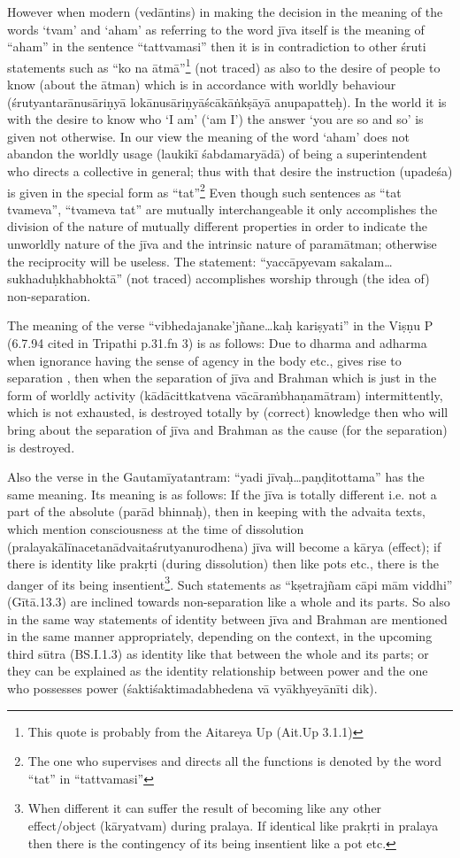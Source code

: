 However when modern (vedāntins) in making the decision in the meaning of the words ‘tvam’ and ‘aham’ as referring to    the word jīva itself is the meaning of “aham” in the sentence “tattvamasi” then it is in contradiction to other śruti statements such as “ko na ātmā”\footnote{This quote is probably from the Aitareya Up (Ait.Up 3.1.1)} (not traced) as also to the desire of people to know (about the ātman)  which is in accordance with worldly behaviour (śrutyantarānusāriṇyā lokānusāriṇyāścākāṅkṣāyā anupapatteḥ). In the world it is with the desire to know who ‘I am’ (`am I') the answer ‘you are so and so’ is given not otherwise. In our view the meaning of the word ‘aham’ does not abandon the worldly usage (laukikī śabdamaryādā) of being a superintendent who directs a collective in general; thus with that desire the instruction (upadeśa) is given in the special form as “tat”\footnote{The one who supervises and directs all the functions is denoted by the word “tat” in “tattvamasi”} Even though such sentences as “tat tvameva”, “tvameva tat” are mutually interchangeable it only accomplishes the division of the nature of mutually different properties in order to indicate the unworldly nature of the jīva and the intrinsic nature of paramātman; otherwise the reciprocity will be useless. The statement: “yaccāpyevam sakalam…sukhaduḥkhabhoktā” (not traced) accomplishes worship through (the idea of) non-separation.

The meaning of the verse “vibhedajanake’jñane…kaḥ kariṣyati” in the Viṣṇu P  (6.7.94 cited in Tripathi p.31.fn 3) is as follows: Due to dharma and adharma when ignorance having the sense of agency in the body etc., gives rise to separation , then when the separation of jīva and Brahman which is just in the form of worldly activity (kādācittkatvena vācāraṁbhaṇamātram) intermittently, which is not exhausted, is destroyed totally by (correct) knowledge then who will bring about the separation of jīva and Brahman as the cause (for the separation) is destroyed.

Also the verse in the Gautamīyatantram: “yadi jīvaḥ…paṇḍitottama” has the same meaning. Its meaning is as follows: If the jīva is totally different i.e. not a part of the absolute (parād bhinnaḥ), then in keeping with the advaita texts, which mention consciousness at the time of dissolution (pralayakālīnacetanādvaitaśrutyanurodhena) jīva will become a kārya (effect); if there is identity like prakṛti (during dissolution) then like pots etc., there is the danger of its being insentient\footnote{When different it can suffer the result of becoming like any other effect/object (kāryatvam) during pralaya. If identical like prakṛti in pralaya then there is the contingency of its being insentient like a pot etc.}. Such statements as “kṣetrajñam cāpi mām viddhi” (Gītā.13.3) are inclined towards non-separation like a whole and its parts. So also in the same way statements of identity between jīva and Brahman are mentioned in the same manner appropriately, depending on the context, in the upcoming third sūtra (BS.I.1.3) as identity like that between the whole and its parts; or they can be explained as the identity relationship between power and the one who possesses power (śaktiśaktimadabhedena vā vyākhyeyānīti dik). 

